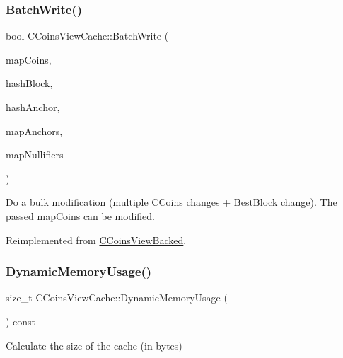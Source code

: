\subsubsection{\texorpdfstring{Batch\+Write()}{BatchWrite()}}
{\footnotesize\ttfamily bool C\+Coins\+View\+Cache\+::\+Batch\+Write (\begin{DoxyParamCaption}\item[{\mbox{\hyperlink{coins_8h_a2886ba2fd0428bae777e1cbcabc02834}{C\+Coins\+Map}} \&}]{map\+Coins,  }\item[{const \mbox{\hyperlink{classuint256}{uint256}} \&}]{hash\+Block,  }\item[{const \mbox{\hyperlink{classuint256}{uint256}} \&}]{hash\+Anchor,  }\item[{\mbox{\hyperlink{coins_8h_a070827cc9d21a91b8f4f4f52a6f7c848}{C\+Anchors\+Map}} \&}]{map\+Anchors,  }\item[{\mbox{\hyperlink{coins_8h_ab651cc287e9594190ef77d2fca2b14c7}{C\+Nullifiers\+Map}} \&}]{map\+Nullifiers }\end{DoxyParamCaption})\hspace{0.3cm}{\ttfamily [virtual]}}

Do a bulk modification (multiple \mbox{\hyperlink{class_c_coins}{C\+Coins}} changes + Best\+Block change). The passed map\+Coins can be modified. 

Reimplemented from \mbox{\hyperlink{class_c_coins_view_backed_ae0f10af7d1cd7706f57628c38426c75c}{C\+Coins\+View\+Backed}}.

\mbox{\label{class_c_coins_view_cache_adc01927480b99814280a4388e738d8b9}} 
\subsubsection{\texorpdfstring{Dynamic\+Memory\+Usage()}{DynamicMemoryUsage()}}
{\footnotesize\ttfamily size\+\_\+t C\+Coins\+View\+Cache\+::\+Dynamic\+Memory\+Usage (\begin{DoxyParamCaption}{ }\end{DoxyParamCaption}) const}



Calculate the size of the cache (in bytes) 

\mbox{\label{class_c_coins_view_cache_a7d385628b7d821d2d5b6c5aaf1734616}} 
